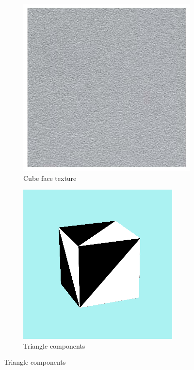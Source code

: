 \begin{figure}[!ht]
	\centering
	\begin{subfigure}{.32\textwidth}
		\centering
		\includegraphics[width=0.8\linewidth]{figures/cube-texture.jpg}
		\caption{Cube face texture}
		\label{fig:cube-texture}
	\end{subfigure}%
	\begin{subfigure}{.32\textwidth}
		\centering
		\includegraphics[width=0.8\linewidth]{figures/cube-triangles-render.PNG}
		\caption{Triangle components}
		\label{fig:cube-triangles-render}
	\end{subfigure}%

\end{figure}
